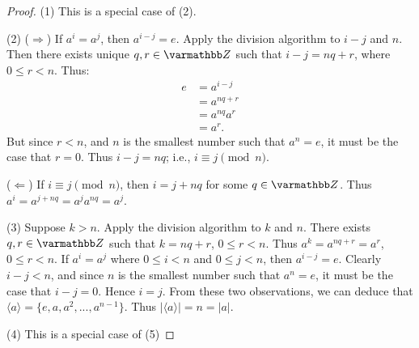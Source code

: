         \begin{proof}
            (1) This is a special case of (2). \nl
            
            \noindent (2) ($\Rightarrow$) If $a^i = a^j$, then $a^{i-j} = e$. Apply the division algorithm to $i-j$ and $n$. Then there exists unique $q,r \in \bfZ$ such that $i-j = nq + r$, where $0 \leq r < n$. Thus:
                \begin{equation*}
                \begin{split}
                    e 
                    & = a^{i-j} \\
                    & = a^{nq + r} \\
                    & = a^{nq}a^r \\
                    & = a^r.
                \end{split}
                \end{equation*}
            But since $r < n$, and $n$ is the smallest number such that $a^n = e$, it must be the case that $r = 0$. Thus $i-j = nq$; i.e., $i \equiv j \pmod{n}$.

            ($\Leftarrow$) If $i \equiv j \pmod{n}$, then $i = j + nq$ for some $q \in \bfZ$. Thus $a^i = a^{j + nq} = a^j a^{nq} = a^j$. \nl
            
            \noindent (3) Suppose $k > n$. Apply the division algorithm to $k$ and $n$. There exists $q,r \in \bfZ$ such that $k = nq + r$, $0 \leq r < n$. Thus $a^k = a^{nq+r} = a^r$, $0 \leq r < n$. If $a^i = a^j$ where $0 \leq i < n$ and $0 \leq j < n$, then $a^{i-j} = e$. Clearly $i-j < n$, and since $n$ is the smallest number such that $a^n = e$, it must be the case that $i - j = 0$. Hence $i = j$. From these two observations, we can deduce that $\langle a \rangle = \{e,a,a^2,...,a^{n-1}\}$. Thus $|\langle a \rangle| = n = |a|$. \nl
            
            \noindent (4) This is a special case of (5) \nl
            

\end{proof}
